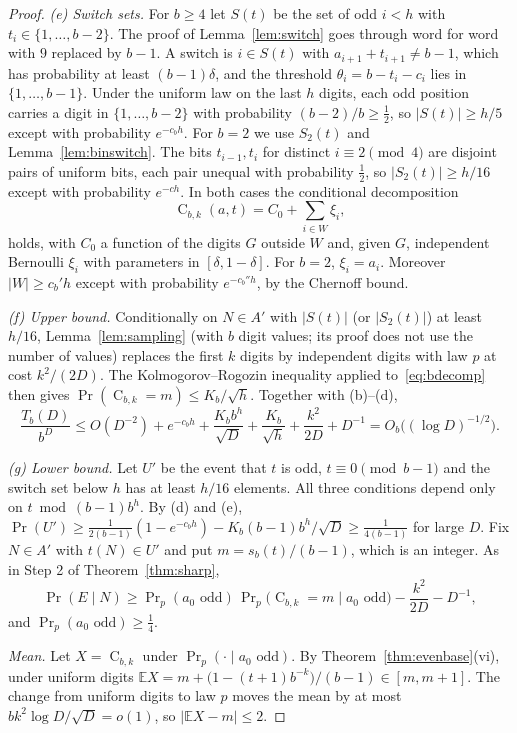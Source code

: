 \documentclass[11pt]{article}
\theoremstyle{definition}
\theoremstyle{remark}
\newcommand{\C}{\operatorname{C}}
\begin{document}
\begin{proof}
\emph{(e) Switch sets.} For $b\ge4$ let $S(t)$ be the set of odd $i<h$ with
$t_i\in\{1,\dots,b-2\}$. The proof of Lemma~\ref{lem:switch} goes through
word for word with $9$ replaced by $b-1$. A switch is $i\in S(t)$ with
$a_{i+1}+t_{i+1}\neq b-1$, which has probability at least $(b-1)\delta$, and
the threshold $\theta_i=b-t_i-c_i$ lies in $\{1,\dots,b-1\}$. Under the
uniform law on the last $h$ digits, each odd position carries a digit in
$\{1,\dots,b-2\}$ with probability $(b-2)/b\ge\frac12$, so
$|S(t)|\ge h/5$ except with probability $e^{-c_bh}$. For $b=2$ we use
$S_2(t)$ and Lemma~\ref{lem:binswitch}. The bits $t_{i-1},t_i$ for distinct
$i\equiv2\pmod4$ are disjoint pairs of uniform bits, each pair unequal with
probability $\frac12$, so $|S_2(t)|\ge h/16$ except with probability
$e^{-ch}$. In both cases the conditional decomposition
\begin{equation}\label{eq:bdecomp}
  \C_{b,k}(a,t)=C_0+\sum_{i\in W}\xi_i ,
\end{equation}
holds, with $C_0$ a function of the digits $G$ outside $W$ and, given $G$,
independent Bernoulli $\xi_i$ with parameters in $[\delta,1-\delta]$. For
$b=2$, $\xi_i=a_i$. Moreover $|W|\ge c_b'h$ except with probability
$e^{-c_b''h}$, by the Chernoff bound.

\emph{(f) Upper bound.} Conditionally on $N\in A'$ with $|S(t)|$ (or
$|S_2(t)|$) at least $h/16$, Lemma~\ref{lem:sampling} (with $b$ digit values;
its proof does not use the number of values) replaces the first $k$ digits
by independent digits with law $p$ at cost $k^2/(2D)$. The
Kolmogorov--Rogozin inequality applied to~\eqref{eq:bdecomp} then gives
$\Pr(\C_{b,k}=m)\le K_b/\sqrt h$. Together with (b)--(d),
\[
  \frac{T_b(D)}{b^D}\le O(D^{-2})+e^{-c_bh}+\frac{K_bb^h}{\sqrt D}
  +\frac{K_b}{\sqrt h}+\frac{k^2}{2D}+D^{-1}=O_b\bigl((\log D)^{-1/2}\bigr).
\]

\emph{(g) Lower bound.} Let $U'$ be the event that $t$ is odd,
$t\equiv0\pmod{b-1}$ and the switch set below $h$ has at least $h/16$
elements. All three conditions depend only on $t\bmod(b-1)b^h$. By (d) and
(e), $\Pr(U')\ge\frac1{2(b-1)}(1-e^{-c_bh})-K_b(b-1)b^h/\sqrt D
\ge\frac1{4(b-1)}$ for large $D$. Fix $N\in A'$ with $t(N)\in U'$ and put
$m=s_b(t)/(b-1)$, which is an integer. As in Step 2 of
Theorem~\ref{thm:sharp},
\[
  \Pr(E\mid N)\ge\Pr\nolimits_p(a_0\text{ odd})\,
  \Pr\nolimits_p\bigl(\C_{b,k}=m\mid a_0\text{ odd}\bigr)-\frac{k^2}{2D}-D^{-1},
\]
and $\Pr_p(a_0\text{ odd})\ge\frac14$.

\emph{Mean.} Let $X=\C_{b,k}$ under $\Pr_p(\cdot\mid a_0\text{ odd})$. By
Theorem~\ref{thm:evenbase}(vi), under uniform digits
$\mathbb EX=m+\bigl(1-(t+1)b^{-k}\bigr)/(b-1)\in[m,m+1]$. The change from
uniform digits to law $p$ moves the mean by at most
$bk^2\log D/\sqrt D=o(1)$, so $|\mathbb EX-m|\le2$.


\end{proof}
\end{document}

